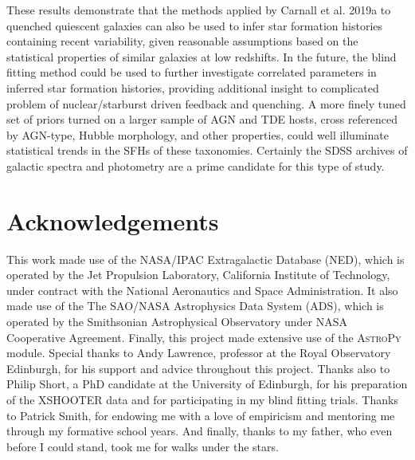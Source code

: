 \documentclass[a4paper,12pt]{article}
\begin{document}
These results demonstrate that the methods applied by Carnall et al. 2019a to
quenched quiescent galaxies can also be used to infer star formation histories
containing recent variability, given reasonable assumptions based on the
statistical properties of similar galaxies at low redshifts. In the future, the
blind fitting method could be used to further investigate correlated parameters
in inferred star formation histories, providing additional insight to
complicated problem of nuclear/starburst driven feedback and quenching. A more
finely tuned set of priors turned on a larger sample of AGN and TDE hosts,
cross referenced by AGN-type, Hubble morphology, and other properties, could
well illuminate statistical trends in the SFHs of these taxonomies. Certainly
the SDSS archives of galactic spectra and photometry are a prime candidate for
this type of study.

\section{Acknowledgements}\label{sec:acknowledgements}

This work made use of the NASA/IPAC Extragalactic Database (NED), which is
operated by the Jet Propulsion Laboratory, California Institute of Technology,
under contract with the National Aeronautics and Space Administration. It also
made use of the The SAO/NASA Astrophysics Data System (ADS), which is operated
by the Smithsonian Astrophysical Observatory under NASA Cooperative Agreement.
Finally, this project made extensive use of the \textsc{AstroPy}
module.\cite{Astropy_2013, Astropy_2018} Special thanks to Andy Lawrence,
professor at the Royal Observatory Edinburgh, for his support and advice
throughout this project. Thanks also to Philip Short, a PhD candidate at the
University of Edinburgh, for his preparation of the XSHOOTER data and for
participating in my blind fitting trials. Thanks to Patrick Smith, for endowing
me with a love of empiricism and mentoring me through my formative school
years. And finally, thanks to my father, who even before I could stand, took me
for walks under the stars.

\printbibliography
\end{document}

